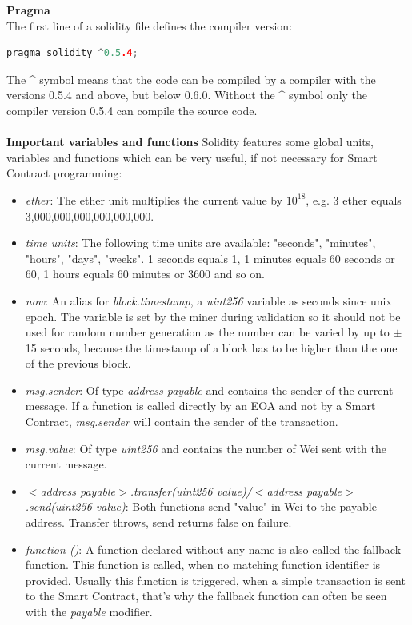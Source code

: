 \leavevmode
\newpage
\textbf{Pragma}\\
The first line of a solidity file defines the compiler version\cite{doc-pragma}:
\begin{lstlisting}[language=C++]
  pragma solidity ^0.5.4;
\end{lstlisting}
The \^{} symbol means that the code can be compiled by a compiler with the versions 0.5.4 and above, but below 0.6.0. Without the \^{} symbol only the compiler version 0.5.4 can compile the source code.
\\\\
\textbf{Important variables and functions}
Solidity features some global units, variables and functions which can be very useful, if not necessary for Smart Contract programming:
\begin{itemize}
  \item \textit{ether}: The ether unit multiplies the current value by \(10^{18}\), e.g. 3 ether equals 3,000,000,000,000,000,000.
  \item \textit{time units}: The following time units are available: "seconds", "minutes", "hours", "days", "weeks". 1 seconds equals 1, 1 minutes equals 60 seconds or 60, 1 hours equals 60 minutes or 3600 and so on.
  \item \textit{now}: An alias for \textit{block.timestamp}, a \textit{uint256} variable as seconds since unix epoch. The variable is set by the miner during validation so it should not be used for random number generation as the number can be varied by up to $\pm$ 15 seconds, because the timestamp of a block has to be higher than the one of the previous block.
  \item \textit{msg.sender}: Of type \textit{address payable} and contains the sender of the current message. If a function is called directly by an EOA and not by a Smart Contract, \textit{msg.sender} will contain the sender of the transaction.
  \item \textit{msg.value}: Of type \textit{uint256} and contains the number of Wei sent with the current message.
  \item \textit{$<$address payable$>$.transfer(uint256 value)/$<$address payable$>$.send(uint256 value)}: Both functions send "value" in Wei to the payable address. Transfer throws, send returns false on failure.
  \item \textit{function ()}: A function declared without any name is also called the fallback function. This function is called, when no matching function identifier is provided. Usually this function is triggered, when a simple transaction is sent to the Smart Contract, that's why the fallback function can often be seen with the \textit{payable} modifier.

\end{itemize}
